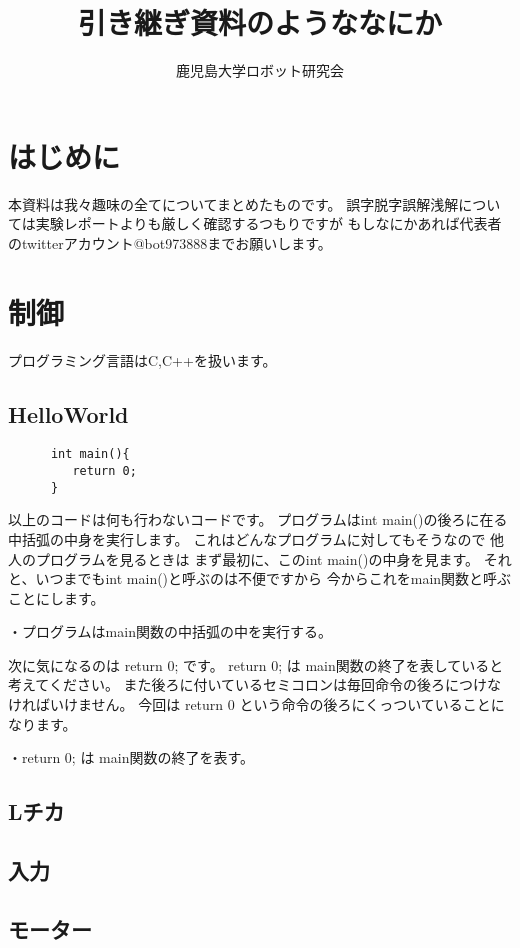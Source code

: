 \documentclass{jarticle}
\begin{document}
\title{引き継ぎ資料のようななにか}
\author{鹿児島大学ロボット研究会}

\maketitle

\tableofcontents
\clearpage

\section{はじめに}
本資料は我々趣味の全てについてまとめたものです。
誤字脱字誤解浅解については実験レポートよりも厳しく確認するつもりですが
もしなにかあれば代表者のtwitterアカウント@bot973888までお願いします。
\clearpage
\section{制御}
   プログラミング言語はC,C++を扱います。
   \subsection{HelloWorld}
   \begin{lstlisting}
      int main(){
         return 0;
      }
   \end{lstlisting}
   以上のコードは何も行わないコードです。
   プログラムはint main()の後ろに在る中括弧の中身を実行します。
   これはどんなプログラムに対してもそうなので
   他人のプログラムを見るときは
   まず最初に、このint main()の中身を見ます。
   それと、いつまでもint main()と呼ぶのは不便ですから
   今からこれをmain関数と呼ぶことにします。
   
     
   ・プログラムはmain関数の中括弧の中を実行する。
  
  
   次に気になるのは return 0; です。
   return 0; は main関数の終了を表していると考えてください。
   また後ろに付いているセミコロンは毎回命令の後ろにつけなければいけません。
   今回は return 0 という命令の後ろにくっついていることになります。


   ・return 0; は main関数の終了を表す。


   \subsection{Lチカ}
   \subsection{入力}
   \subsection{モーター}
\end{document}
